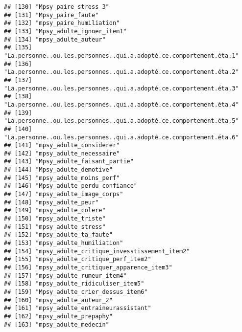 \documentclass[
]{article}
\begin{document}
\begin{verbatim}
## [130] "Mpsy_paire_stress_3"                                               
## [131] "Mpsy_paire_faute"                                                  
## [132] "mpsy_paire_humiliation"                                            
## [133] "Mpsy_adulte_ignoer_item1"                                          
## [134] "mpsy_adulte_auteur"                                                
## [135] "La.personne..ou.les.personnes..qui.a.adopté.ce.comportement.éta.1" 
## [136] "La.personne..ou.les.personnes..qui.a.adopté.ce.comportement.éta.2" 
## [137] "La.personne..ou.les.personnes..qui.a.adopté.ce.comportement.éta.3" 
## [138] "La.personne..ou.les.personnes..qui.a.adopté.ce.comportement.éta.4" 
## [139] "La.personne..ou.les.personnes..qui.a.adopté.ce.comportement.éta.5" 
## [140] "La.personne..ou.les.personnes..qui.a.adopté.ce.comportement.éta.6" 
## [141] "mpsy_adulte_considerer"                                            
## [142] "mpsy_adulte_necessaire"                                            
## [143] "Mpsy_adulte_faisant_partie"                                        
## [144] "Mpsy_adulte_demotive"                                              
## [145] "mpsy_adulte_moins_perf"                                            
## [146] "Mpsy_adulte_perdu_confiance"                                       
## [147] "mpsy_adulte_image_corps"                                           
## [148] "mpsy_adulte_peur"                                                  
## [149] "mpsy_adulte_colere"                                                
## [150] "mpsy_adulte_triste"                                                
## [151] "mpsy_adulte_stress"                                                
## [152] "mpsy_adulte_ta_faute"                                              
## [153] "mpsy_adulte_humiliation"                                           
## [154] "mpsy_adulte_critique_invesstissement_item2"                        
## [155] "mpsy_adulte_critique_perf_item2"                                   
## [156] "mpsy_adulte_critiquer_apparence_item3"                             
## [157] "mpsy_adulte_rumeur_item4"                                          
## [158] "mpsy_adulte_ridiculiser_item5"                                     
## [159] "Mpsy_adulte_crier_dessus_item6"                                    
## [160] "mpsy_adulte_auteur_2"                                              
## [161] "mpsy_adulte_entraineurassistant"                                   
## [162] "mpsy_adulte_prepaphy"                                              
## [163] "mpsy_adulte_medecin"                                               

\end{verbatim}
\end{document}
